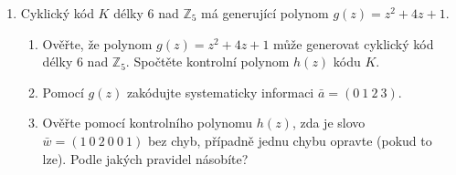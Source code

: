 \documentclass[11pt, a4paper]{article}
\begin{document}
\begin{enumerate}
    \item \relax [5 bodů] Cyklický kód $K$ délky 6 nad $\mathbb{Z}_5$ má generující polynom $g(z) = z^2 + 4z + 1$.
    \begin{enumerate}
        \item \relax [1 bod] Ověřte, že polynom $g(z) = z^2 + 4z + 1$ může generovat cyklický kód délky 6 nad $\mathbb{Z}_5$. Spočtěte kontrolní polynom $h(z)$ kódu $K$.
        \item \relax [2 body] Pomocí $g(z)$ zakódujte systematicky informaci $\bar{a} = (0\ 1\ 2\ 3)$.
        \item \relax [2 body] Ověřte pomocí kontrolního polynomu $h(z)$, zda je slovo $\bar{w} = (1\ 0\ 2\ 0\ 0\ 1)$ bez chyb, případně jednu chybu opravte (pokud to lze). Podle jakých pravidel násobíte?
    \end{enumerate}
\end{enumerate}
\end{document}
